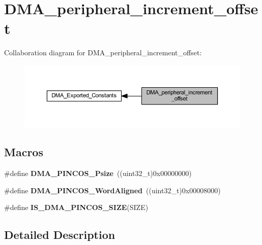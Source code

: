 \hypertarget{group___d_m_a__peripheral__increment__offset}{}\section{D\+M\+A\+\_\+peripheral\+\_\+increment\+\_\+offset}
\label{group___d_m_a__peripheral__increment__offset}
Collaboration diagram for D\+M\+A\+\_\+peripheral\+\_\+increment\+\_\+offset\+:
\nopagebreak
\begin{figure}[H]
\begin{center}
\leavevmode
\includegraphics[width=350pt]{group___d_m_a__peripheral__increment__offset}
\end{center}
\end{figure}
\subsection*{Macros}
\begin{DoxyCompactItemize}
\item 
\mbox{\label{group___d_m_a__peripheral__increment__offset_ga939053c42e486b82963b8eecc809bce0}} 
\#define {\bfseries D\+M\+A\+\_\+\+P\+I\+N\+C\+O\+S\+\_\+\+Psize}~((uint32\+\_\+t)0x00000000)
\item 
\mbox{\label{group___d_m_a__peripheral__increment__offset_gaae8184971db13b62cd9f4dc5aecf9c22}} 
\#define {\bfseries D\+M\+A\+\_\+\+P\+I\+N\+C\+O\+S\+\_\+\+Word\+Aligned}~((uint32\+\_\+t)0x00008000)
\item 
\#define {\bfseries I\+S\+\_\+\+D\+M\+A\+\_\+\+P\+I\+N\+C\+O\+S\+\_\+\+S\+I\+ZE}(S\+I\+ZE)
\end{DoxyCompactItemize}


\subsection{Detailed Description}


